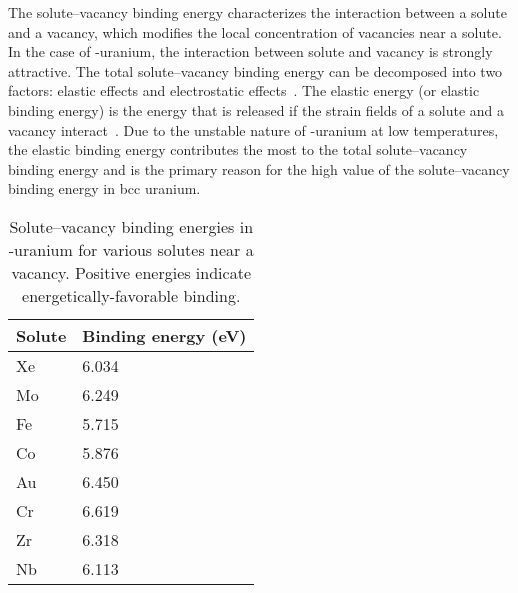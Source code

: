 The solute--vacancy binding energy characterizes the interaction between a
solute and a vacancy, which modifies the local concentration of vacancies near
a solute. In the case of \mbox{\textgamma-uranium}, the interaction between
solute and vacancy is strongly attractive.
The total solute--vacancy binding energy can be decomposed into two factors: 
elastic effects and electrostatic effects~\cite{burke1972measurement}.
The elastic energy (or elastic binding energy) is the energy that is released
if the strain fields of a solute and a vacancy
interact~\cite{ohnuma2009first,kong2014first}.
Due to the unstable nature of \mbox{\textgamma-uranium} at low temperatures,
the elastic binding energy contributes the most to the total solute--vacancy
binding energy and is the primary reason for the high value of the
solute--vacancy binding energy in bcc uranium. 


\begin{table}
    \centering
    \caption[Solute--vacancy binding energies in \textgamma-uranium for
        various solutes near a vacancy]{Solute--vacancy binding energies in \textgamma-uranium for
        various solutes near a vacancy.
        Positive energies indicate energetically-favorable binding.}
    \label{tab_solvac}
    \begin{tabular}{l l}
      \toprule
        Solute & Binding energy (eV) \\
      \midrule
        Xe & 6.034 \\
        Mo & 6.249 \\
        Fe & 5.715 \\
        Co & 5.876 \\
        Au & 6.450 \\
        Cr & 6.619 \\
        Zr & 6.318 \\
        Nb & 6.113 \\
      \bottomrule
    \end{tabular}
\end{table}

